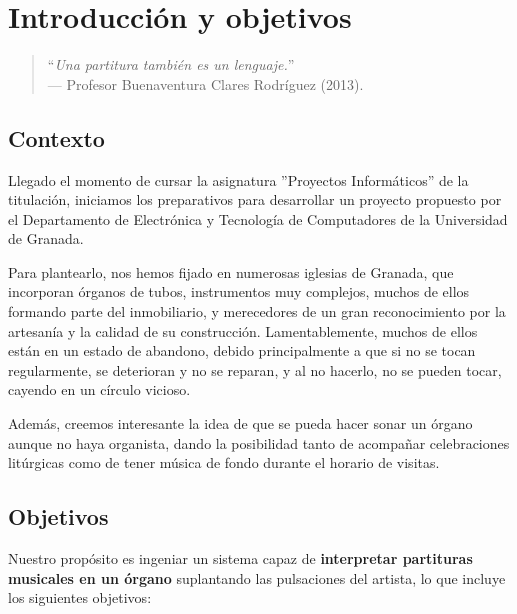 \chapter{Introducción y objetivos}
\label{cap:capitulo_1}

\begin{quote}
	\small \flushright ``\textit{Una partitura también es un lenguaje.}'' \\
	--- Profesor Buenaventura Clares Rodríguez (2013).
\end{quote}

\vspace{4em}

\section{Contexto}

Llegado el momento de cursar la asignatura ''Proyectos Informáticos'' de la titulación, iniciamos los preparativos para desarrollar un proyecto propuesto por el Departamento de Electrónica y Tecnología de Computadores de la Universidad de Granada.

Para plantearlo, nos hemos fijado en numerosas iglesias de Granada, que incorporan órganos de tubos, instrumentos muy complejos, muchos de ellos formando parte del inmobiliario, y merecedores de un gran reconocimiento por la artesanía y la calidad de su construcción. Lamentablemente, muchos de ellos están en un estado de abandono, debido principalmente a que si no se tocan regularmente, se deterioran y no se reparan, y al no hacerlo, no se pueden tocar, cayendo en un círculo vicioso.

Además, creemos interesante la idea de que se pueda hacer sonar un órgano aunque no haya organista, dando la posibilidad tanto de acompañar celebraciones litúrgicas como de tener música de fondo durante el horario de visitas.

\section{Objetivos}

Nuestro propósito es ingeniar un sistema capaz de \textbf{interpretar partituras musicales en un órgano} suplantando las pulsaciones del artista, lo que incluye los siguientes objetivos:

